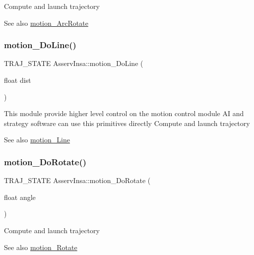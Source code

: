 Compute and launch trajectory \begin{DoxySeeAlso}{See also}
\hyperlink{classAsservInsa_ad243e9562a5191e34aed076e52e8fab8}{motion\+\_\+\+Arc\+Rotate} 
\end{DoxySeeAlso}
\mbox{\label{classAsservInsa_a3cb6f1cf5557851312a8398b79514905}} 
\subsubsection{\texorpdfstring{motion\+\_\+\+Do\+Line()}{motion\_DoLine()}}
{\footnotesize\ttfamily T\+R\+A\+J\+\_\+\+S\+T\+A\+TE Asserv\+Insa\+::motion\+\_\+\+Do\+Line (\begin{DoxyParamCaption}\item[{float}]{dist }\end{DoxyParamCaption})}

This module provide higher level control on the motion control module AI and strategy software can use this primitives directly Compute and launch trajectory \begin{DoxySeeAlso}{See also}
\hyperlink{classAsservInsa_ab0fe0ad459e394938598a8b031118edb}{motion\+\_\+\+Line} 
\end{DoxySeeAlso}
\mbox{\label{classAsservInsa_ab45e49759207b2ba9abcb17b1d567abf}} 
\subsubsection{\texorpdfstring{motion\+\_\+\+Do\+Rotate()}{motion\_DoRotate()}}
{\footnotesize\ttfamily T\+R\+A\+J\+\_\+\+S\+T\+A\+TE Asserv\+Insa\+::motion\+\_\+\+Do\+Rotate (\begin{DoxyParamCaption}\item[{float}]{angle }\end{DoxyParamCaption})}

Compute and launch trajectory \begin{DoxySeeAlso}{See also}
\hyperlink{classAsservInsa_ae7c7edab12c43ce352a694e95994c972}{motion\+\_\+\+Rotate} 
\end{DoxySeeAlso}
\mbox{\label{classAsservInsa_ab0fe0ad459e394938598a8b031118edb}} 
